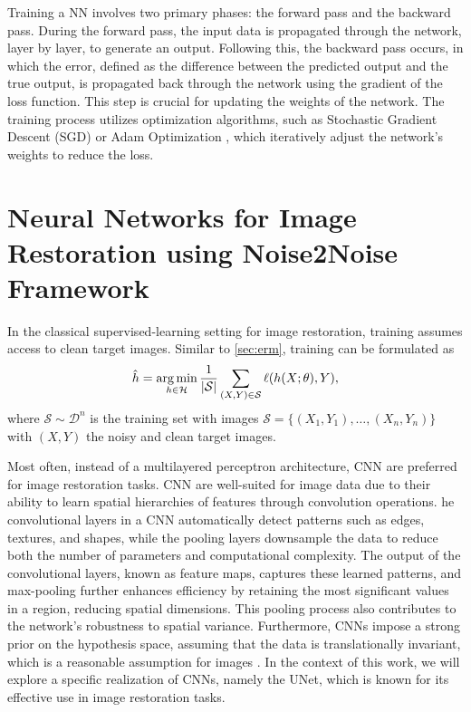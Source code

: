 Training a \gls{NN} involves two primary phases: the forward pass and the backward pass. During the forward pass, the input data is propagated through the network, layer by layer, to generate an output. Following this, the backward pass occurs, in which the error, defined as the difference between the predicted output and the true output, is propagated back through the network using the gradient of the loss function. This step is crucial for updating the weights of the network.
The training process utilizes optimization algorithms, such as Stochastic Gradient Descent (SGD) \cite{sutskeverImportanceInitializationMomentum2013} or Adam Optimization \cite{kingmaAdamMethodStochastic2017}, which iteratively adjust the network's weights to reduce the loss.

\section{Neural Networks for Image Restoration using Noise2Noise Framework}
In the classical supervised-learning setting for image restoration, training assumes access to clean target images. Similar to \cref{sec:erm}, training can be formulated as
\begin{equation}
    \hat{h} = \operatorname*{arg\,min}_{h \in \mathcal{H}} \frac{1}{\lvert \mathcal{S} \rvert} \sum_{(X, Y) \in \mathcal{S}} \ell(h(X; \theta), Y),
\end{equation}
where $\mathcal{S} \sim \mathcal{D}^n$ is the training set with images $\mathcal{S} = \{(X_1, Y_1), \dots, (X_n, Y_n)\}$ with $(X, Y)$  the noisy and clean target images.

Most often, instead of a multilayered perceptron architecture, \gls{CNN} are preferred for image restoration tasks. \gls{CNN} are well-suited for image data due to their ability to learn spatial hierarchies of features through convolution operations. he convolutional layers in a \gls{CNN} automatically detect patterns such as edges, textures, and shapes, while the pooling layers downsample the data to reduce both the number of parameters and computational complexity. The output of the convolutional layers, known as feature maps, captures these learned patterns, and max-pooling further enhances efficiency by retaining the most significant values in a region, reducing spatial dimensions. This pooling process also contributes to the network’s robustness to spatial variance. Furthermore, \glspl{CNN} impose a strong prior on the hypothesis space, assuming that the data is translationally invariant, which is a reasonable assumption for images \cite{goodfellowDeepLearning2016}. In the context of this work, we will explore a specific realization of \glspl{CNN}, namely the UNet, which is known for its effective use in image restoration tasks.

